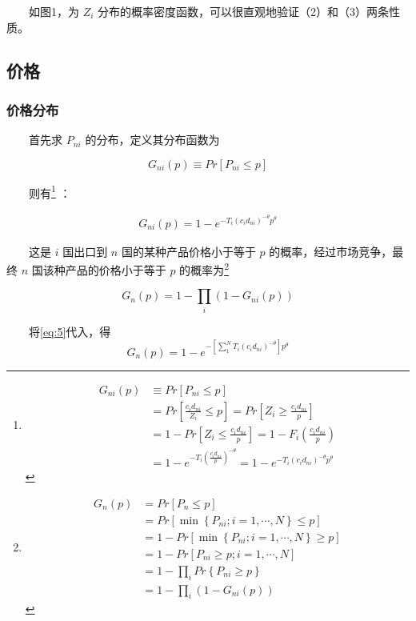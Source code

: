 \documentclass[
]{article}
\begin{document}
　　如图1，为 \(Z_i\) 分布的概率密度函数，可以很直观地验证（2）和（3）两条性质。

\hypertarget{ux4ef7ux683c}{%
\subsection{价格}\label{ux4ef7ux683c}}

\hypertarget{ux4ef7ux683cux5206ux5e03}{%
\subsubsection{价格分布}\label{ux4ef7ux683cux5206ux5e03}}

　　首先求 \(P_{ni}\) 的分布，定义其分布函数为

\[
G_{ni}(p) \equiv Pr[P_{ni} \le p]  
\]

　　则有\footnote{\[
  \begin{aligned}
  G_{ni}(p) & \equiv Pr[P_{ni} \le p] \\  
  &= Pr[\frac {{c_i}d_{ni}}{Z_i} \le p]  = Pr[Z_i \geq \frac {{c_i}d_{ni}}{p}] \\ & = 1-Pr[Z_i \le \frac {{c_i}d_{ni}}{p}] = 1 - F_i(\frac {{c_i}d_{ni}}{p}) \\  
  &= 1 - e^{-T_{i} (\frac {{c_i}d_{ni}}{p})^{-\theta}} = 1-e^{-T_{i} ( {{c_i}d_{ni}})^{-\theta}p^{\theta}} 
  \end{aligned}
  \]} ：

\begin{align}
G_{ni}(p) =1-e^{-T_{i} ( {{c_i}d_{ni}})^{-\theta}p^{\theta}}  \label{eq:5}
\end{align}

　　这是 \(i\) 国出口到 \(n\) 国的某种产品价格小于等于 \(p\) 的概率，经过市场竞争，最终 \(n\) 国该种产品的价格小于等于 \(p\) 的概率为\footnote{\[
  \begin{aligned}
  G_n(p) &= Pr[P_n \le p] \\ &=Pr[ \min \left\{P_{n i} ; i=1, \cdots, N\right\} \le p] \\ &= 1 - Pr[ \min \left\{P_{n i} ; i=1, \cdots, N\right\} \geq p] \\ &= 1- Pr[ P_{n i}  \geq p; i=1, \cdots, N]\\ &=1-\prod_{i}Pr\left\{P_{ni}\geq p\right\} \\ &=1-\prod_{i}{(1-G_{ni}\left(p\right))}
  \end{aligned}
  \]}

\[
G_n(p) =1-\prod_{i}{(1-G_{ni}\left(p\right))}
\]

　　将\eqref{eq:5}代入，得 \[G_n\left(p\right)=1-e^{-[\sum_{1}^{N}T_{i} ( {{c_i}d_{ni}})^{-\theta}]p^{\theta}} \]
\end{document}
